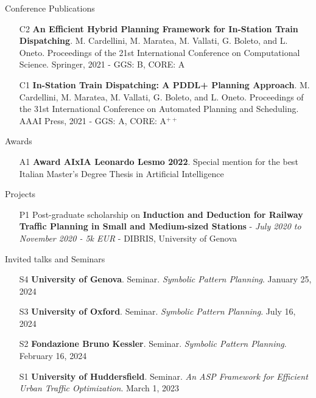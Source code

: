 \documentclass{resume} %
\begin{document}
\begin{rSection}{Conference Publications}
\begin{enumerate}[leftmargin=5mm]
	\item[C2] \textbf{An Efficient Hybrid Planning Framework for In-Station Train Dispatching}. M. Cardellini, M. Maratea, M. Vallati, G. Boleto, and L. Oneto. Proceedings of the 21st International Conference on Computational Science. Springer, 2021 - GGS: B, CORE: A
	
	\item[C1] \textbf{In-Station Train Dispatching: A PDDL+ Planning Approach}. M. Cardellini, M. Maratea, M. Vallati, G. Boleto, and L. Oneto. Proceedings of the 31st International Conference on Automated Planning and Scheduling. AAAI Press, 2021 - GGS: A, CORE: A$^{++}$
\end{enumerate}
\end{rSection}

\begin{rSection}{Awards}
\begin{enumerate}[leftmargin=5mm]
	\item[A1] \textbf{Award AIxIA Leonardo Lesmo 2022}. Special mention for the best Italian Master's Degree Thesis in Artificial Intelligence
\end{enumerate}
\end{rSection}
\break
\begin{rSection}{Projects}

\begin{enumerate}[leftmargin=5mm]
\item[P1] Post-graduate scholarship on \textbf{Induction and Deduction for Railway Traffic Planning in Small and Medium-sized Stations} - \textit{July 2020 to November 2020 - 5k EUR} - DIBRIS, University of Genova
\end{enumerate}
\end{rSection}

\begin{rSection}{Invited talks and Seminars} %
\begin{enumerate}[leftmargin=5mm]
	\item[S4] \textbf{University of Genova}. Seminar. \textit{Symbolic Pattern Planning}. January 25, 2024
	\item[S3] \textbf{University of Oxford}. Seminar. \textit{Symbolic Pattern Planning}. July 16, 2024
	\item[S2] \textbf{Fondazione Bruno Kessler}. Seminar. \textit{Symbolic Pattern Planning}. February 16, 2024
	\item[S1] \textbf{University of Huddersfield}. Seminar. \textit{An ASP Framework for Efficient Urban Traffic Optimization}. March 1, 2023
\end{enumerate}


\end{rSection}
\end{document}
